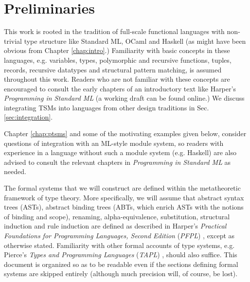 
\section{Preliminaries}\label{sec:preliminaries}
This work is rooted in the tradition of full-scale functional languages with non-trivial type structure like Standard ML, OCaml and Haskell (as might have been obvious from Chapter \ref{chap:intro}.) Familiarity with basic concepts in these languages, e.g. variables, types, polymorphic and recursive functions, tuples, records, recursive datatypes and structural pattern matching, is assumed throughout this work. Readers who are not familiar with these concepts are encouraged to consult the early chapters of an introductory text like Harper's \emph{Programming in Standard ML} \cite{harper1997programming} (a working draft can be found online.) We discuss integrating TSMs into languages from other design traditions in Sec. \ref{sec:integration}.

Chapter \ref{chap:ptsms} and some of the motivating examples given below, consider questions of integration with an ML-style module system, so readers with experience in a language without such a module system (e.g. Haskell) are also advised to consult the relevant chapters in \emph{Programming in Standard ML} \cite{harper1997programming} as needed.

The formal systems that we will construct are defined within the metatheoretic framework of type theory. More specifically, we will assume that abstract syntax trees (ASTs), abstract binding trees (ABTs, which enrich ASTs with the notions of binding and scope), renaming, alpha-equivalence, substitution, structural induction and rule induction are defined as described in Harper's \emph{Practical Foundations for Programming Languages, Second Edition} (\emph{PFPL}) \cite{pfpl}, except as otherwise stated. Familiarity with other formal accounts of type systems, e.g. Pierce's \emph{Types and Programming Languages} (\emph{TAPL}) \cite{tapl}, should also suffice. This document is organized so as to be readable even if the sections defining formal systems are skipped entirely (although much precision will, of course, be lost).

